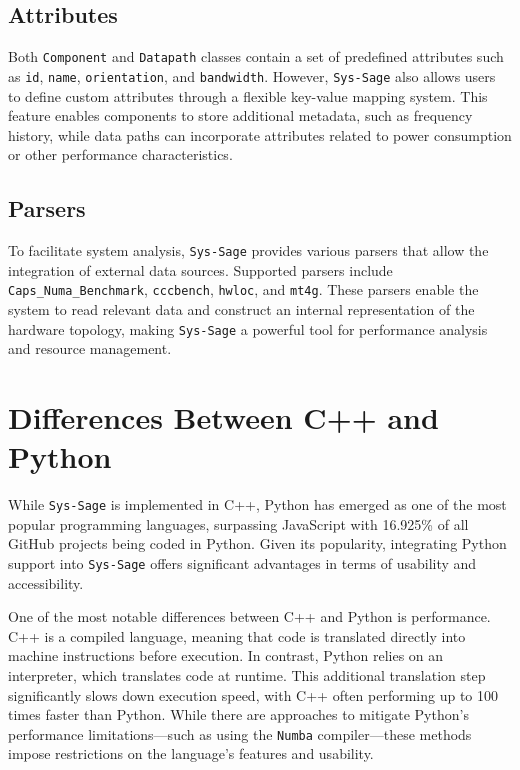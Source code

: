 \subsection{Attributes}

Both \texttt{Component} and \texttt{Datapath} classes contain a set of predefined attributes such as \texttt{id}, \texttt{name}, \texttt{orientation}, and \texttt{bandwidth}. However, \texttt{Sys-Sage} also allows users to define custom attributes through a flexible key-value mapping system. This feature enables components to store additional metadata, such as frequency history, while data paths can incorporate attributes related to power consumption or other performance characteristics.

\subsection{Parsers}

To facilitate system analysis, \texttt{Sys-Sage} provides various parsers that allow the integration of external data sources. Supported parsers include \texttt{Caps\_Numa\_Benchmark}, \texttt{cccbench}, \texttt{hwloc}, and \texttt{mt4g}. These parsers enable the system to read relevant data and construct an internal representation of the hardware topology, making \texttt{Sys-Sage} a powerful tool for performance analysis and resource management.

\section{Differences Between C++ and Python}

While \texttt{Sys-Sage} is implemented in C++, Python has emerged as one of the most popular programming languages, surpassing JavaScript with 16.925\% of all GitHub projects being coded in Python. Given its popularity, integrating Python support into \texttt{Sys-Sage} offers significant advantages in terms of usability and accessibility.

One of the most notable differences between C++ and Python is performance. C++ is a compiled language, meaning that code is translated directly into machine instructions before execution. In contrast, Python relies on an interpreter, which translates code at runtime. This additional translation step significantly slows down execution speed, with C++ often performing up to 100 times faster than Python. While there are approaches to mitigate Python's performance limitations—such as using the \texttt{Numba} compiler\parencite{numba}—these methods impose restrictions on the language’s features and usability.


